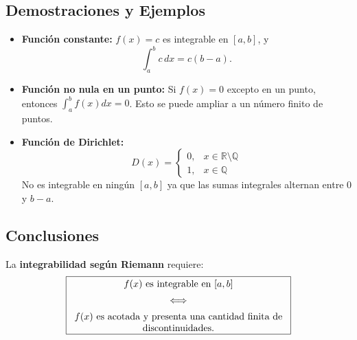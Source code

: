 \documentclass{article}
\begin{document}
\subsection*{Demostraciones y Ejemplos}
\begin{itemize}
    \item \textbf{Función constante:} \( f(x) = c \) es integrable en \([a, b]\),
    y \[
    \int_{a}^{b} c \, dx = c(b-a).
    \]

    \item \textbf{Función no nula en un punto:} Si \( f(x) = 0 \) excepto en un punto, entonces \( \int_{a}^{b} f(x) dx = 0 \). Esto se puede ampliar a un número finito de puntos.  

    \item \textbf{Función de Dirichlet:}
    \[
    D(x) =
    \begin{cases}
        0, & x \in \mathbb{R} \setminus \mathbb{Q} \\
        1, & x \in \mathbb{Q}
    \end{cases}
    \]
    No es integrable en ningún \( [a, b] \) ya que las sumas integrales alternan entre \(0\) y \( b -a \).
\end{itemize}

\subsection*{Conclusiones}
La \textbf{integrabilidad según Riemann} requiere: 
\[
\boxed{
    \parbox{8cm}{
            \centering
            \( f(x) \) es integrable en \([a, b]\) \\[0.5em]
            \(\iff\) \\[0.5em]
            \( f(x) \) es acotada y presenta una cantidad finita de discontinuidades.
    }
}
\]
\end{document}

